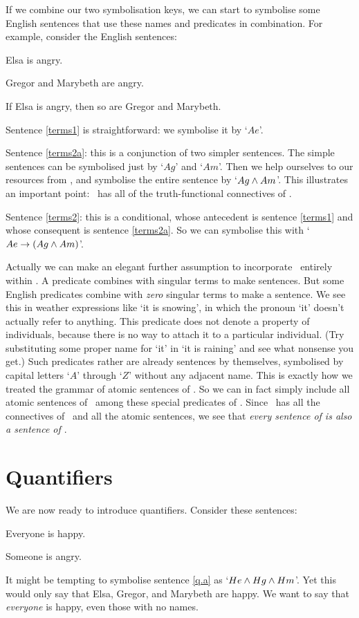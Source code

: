 If we combine our two symbolisation keys, we can start to symbolise some English sentences that use these names and predicates in combination. For example, consider the English sentences:
	\begin{earg}
		\item[\ex{terms1}] Elsa is angry.
		\item[\ex{terms2a}] Gregor and Marybeth are angry.
		\item[\ex{terms2}] If Elsa is angry, then so are Gregor and Marybeth.
	\end{earg}
Sentence \ref{terms1} is straightforward: we symbolise it by `$Ae$'.

Sentence \ref{terms2a}: this is a conjunction of two simpler sentences. The simple sentences can be symbolised just by `$Ag$' and `$Am$'. Then we help ourselves to our resources from \TFL, and symbolise the entire sentence by `$Ag \wedge Am$'. This illustrates an important point: \FOL\ has all of the truth-functional connectives of \TFL.

Sentence \ref{terms2}: this is a conditional, whose antecedent is sentence \ref{terms1} and whose consequent is sentence \ref{terms2a}. So we can symbolise this with `$Ae \rightarrow (Ag \wedge Am)$'.

Actually we can make an elegant further assumption to incorporate \TFL\ entirely within \FOL. A predicate combines with singular terms to make sentences. But some English predicates combine with \emph{zero} singular terms to make a sentence. We see this in weather expressions like `it is snowing', in which the pronoun `it' doesn't actually refer to anything. This predicate does not denote a property of individuals, because there is no way to attach it to a particular individual. (Try substituting some proper name for `it' in `it is raining' and see what nonsense you get.) Such predicates rather are already sentences by themselves, symbolised by capital letters `$A$' through `$Z$' without any adjacent name. This is exactly how we treated the grammar of atomic sentences of \TFL. So we can in fact simply include all atomic sentences of \TFL\ among these special predicates of \FOL. Since \FOL\ has all the connectives of \TFL\ and all the atomic sentences, we see that \emph{every sentence of \textnormal{\TFL} is also a sentence of \textnormal{\FOL}}.

\section{Quantifiers}\label{quant.pron}
We are now ready to introduce quantifiers. Consider these sentences:
	\begin{earg}
		\item[\ex{q.a}] Everyone is happy.
		\item[\ex{q.e}] Someone is angry.
	\end{earg}
It might be tempting to symbolise sentence \ref{q.a} as `$He \wedge Hg \wedge Hm$'. Yet this would only say that Elsa, Gregor, and Marybeth are happy. We want to say that \emph{everyone} is happy, even those with no names. %

